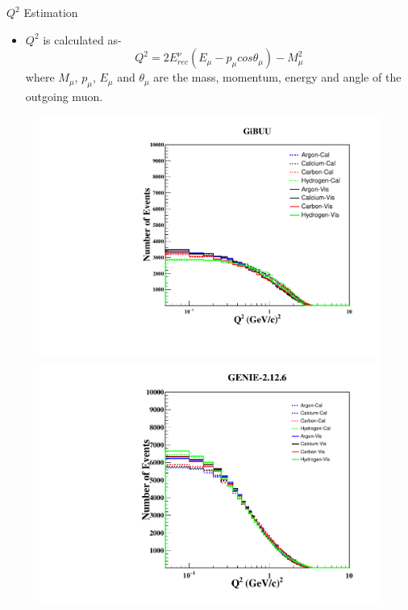 \documentclass[9pt]{beamer}    %
\begin{document}
\begin{frame}{$Q^{2}$ Estimation}
 \begin{itemize}
  \item $Q^{2}$ is calculated as-
  \begin{equation}
   Q^{2} = 2E_{rec}^{\nu}(E_{\mu}-p_{\mu}cos \theta_{\mu}) - M^{2}_{\mu}
  \end{equation}
 where $M_{\mu}$, $p_{\mu}$, $E_{\mu}$ and $\theta_{\mu}$ are the mass, momentum, energy and angle of the outgoing muon.
 \end{itemize}

\begin{figure}
 \includegraphics[scale=0.30]{AllTargetsQ2norm}
\includegraphics[scale=0.27]{AllTargetQ25GeVGenie}
\end{figure}
\end{frame}
\end{document}

